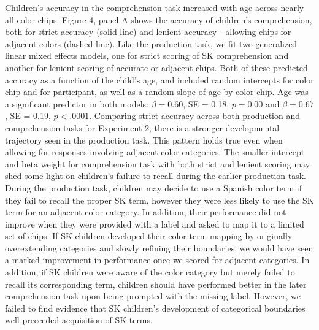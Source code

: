 \documentclass[
  english,
  ,man,floatsintext]{apa6}
\begin{document}
Children's accuracy in the comprehension task increased with age across nearly all color chips. Figure 4, panel A shows the accuracy of children's comprehension, both for strict accuracy (solid line) and lenient accuracy---allowing chips for adjacent colors (dashed line). Like the production task, we fit two generalized linear mixed effects models, one for strict scoring of SK comprehension and another for lenient scoring of accurate or adjacent chips. Both of these predicted accuracy as a function of the child's age, and included random intercepts for color chip and for participant, as well as a random slope of age by color chip. Age was a significant predictor in both models: \(\beta = 0.60\), SE = 0.18, \(p = 0.00\) and \(\beta = 0.67\), SE = 0.19, \(p < .0001\).
Comparing strict accuracy across both production and comprehension tasks for Experiment 2, there is a stronger developmental trajectory seen in the production task. This pattern holds true even when allowing for responses involving adjacent color categories. The smaller intercept and beta weight for comprehension task with both strict and lenient scoring may shed some light on children's failure to recall during the earlier production task. During the production task, children may decide to use a Spanish color term if they fail to recall the proper SK term, however they were less likely to use the SK term for an adjacent color category. In addition, their performance did not improve when they were provided with a label and asked to map it to a limited set of chips. If SK children developed their color-term mapping by originally overextending categories and slowly refining their boundaries, we would have seen a marked improvement in performance once we scored for adjacent categories. In addition, if SK children were aware of the color category but merely failed to recall its corresponding term, children should have performed better in the later comprehension task upon being prompted with the missing label. However, we failed to find evidence that SK children's development of categorical boundaries well preceeded acquisition of SK terms.
\end{document}
